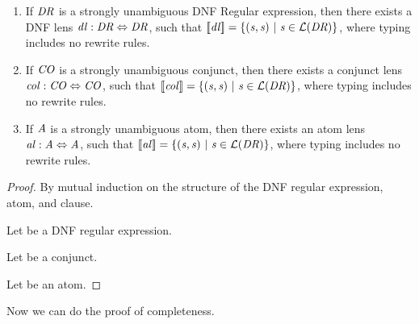 \begin{lemma}
\leavevmode
\begin{enumerate}
\item If $\mathit{DR}$ is a strongly unambiguous DNF Regular expression, then
there exists a DNF lens $\mathit{dl} : \mathit{DR} \Leftrightarrow \mathit{DR}$,
such that $[ \! [\mathit{dl}] \! ]=
\{(\mathit{s},\mathit{s})~|~\mathit{s}\in\mathcal{L}(\mathit{DR})\}$, where
\DNFLens{} typing includes no rewrite rules.
\item If $\mathit{CO}$ is a strongly unambiguous conjunct, then
there exists a conjunct lens $\mathit{col} : \mathit{CO} \Leftrightarrow \mathit{CO}$,
such that $[ \! [\mathit{col}] \! ]=
\{(\mathit{s},\mathit{s})~|~\mathit{s}\in\mathcal{L}(\mathit{DR})\}$, where
\ConjunctLens{} typing includes no rewrite rules.
\item If $\mathit{A}$ is a strongly unambiguous atom, then
there exists an atom lens $\mathit{al} : \mathit{A} \Leftrightarrow \mathit{A}$,
such that $[ \! [\mathit{al}] \! ]=
\{(\mathit{s},\mathit{s})~|~\mathit{s}\in\mathcal{L}(\mathit{DR})\}$, where
\AtomLens{} typing includes no rewrite rules.
\end{enumerate}
\end{lemma}
\begin{proof}
By mutual induction on the structure of the DNF regular expression,
atom, and clause.

Let \DNFRegex{} be a DNF regular expression.

Let \Conjunct{} be a conjunct.

Let \Atom{} be an atom.
\end{proof}

Now we can do the proof of completeness.
\dnflc*

